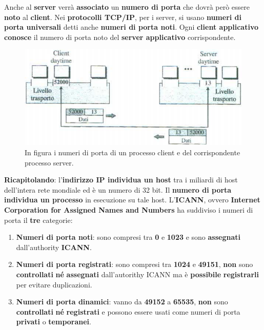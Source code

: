 \documentclass[11pt,a4paper]{article}
\theoremstyle{definition}
\begin{document}
Anche al \textbf{server} verrà \textbf{associato} un \textbf{numero di porta} che dovrà però essere \textbf{noto} al \textbf{client}. Nei \textbf{protocolli TCP/IP},  per i server, si usano \textbf{numeri di porta universali} detti anche \textbf{numeri di porta noti}. Ogni \textbf{client applicativo conosce} il numero di porta noto del \textbf{server applicativo} corrispondente.\newline\newline
\begin{figure}[!h]
	\includegraphics[scale=0.5]{Immagini/Port_numb.png}
	\centering
	\caption{In figura i numeri di porta di un processo client e del corrispondente processo server.}
\end{figure}\newline
\textbf{Ricapitolando}: l'\textbf{indirizzo IP individua un host} tra i miliardi di host dell'intera rete mondiale ed è un numero di 32 bit. Il \textbf{numero di porta individua un processo} in esecuzione su tale host.
\newpage
L'\textbf{ICANN}, ovvero \textbf{Internet Corporation for Assigned Names and Numbers} ha suddiviso i numeri di porta il \textbf{tre} categorie:
\begin{enumerate}
	\item \textbf{Numeri di porta noti}: sono compresi tra \textbf{0} e \textbf{1023} e sono \textbf{assegnati} dall'authority \textbf{ICANN}.
	\item \textbf{Numeri di porta registrati}: sono compresi tra \textbf{1024} e \textbf{49151}, \textbf{non} sono \textbf{controllati} \textbf{né} \textbf{assegnati} dall'autorithy ICANN ma è \textbf{possibile} \textbf{registrarli} per evitare duplicazioni.
	\item \textbf{Numeri di porta dinamici}: vanno da \textbf{49152} a \textbf{65535}, \textbf{non} sono \textbf{controllati} \textbf{né} \textbf{registrati} e possono essere usati come numeri di porta \textbf{privati} o \textbf{temporanei}.
\end{enumerate}
\end{document}
